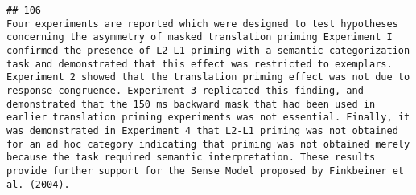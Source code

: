 \documentclass[
  english,
  man]{apa6}
\begin{document}
\begin{verbatim}
## 106                                                                                                                                                                                                                                                                                                                                                                                                                                                                                                                                                                                                                                                                                                                                                                                                                                                                                                                                                                                                                                                                                                                                                                                                                                                                                                                                                                                                                                                                                                                                                                                                                                                                                                                                                                                                         Four experiments are reported which were designed to test hypotheses concerning the asymmetry of masked translation priming Experiment I confirmed the presence of L2-L1 priming with a semantic categorization task and demonstrated that this effect was restricted to exemplars. Experiment 2 showed that the translation priming effect was not due to response congruence. Experiment 3 replicated this finding, and demonstrated that the 150 ms backward mask that had been used in earlier translation priming experiments was not essential. Finally, it was demonstrated in Experiment 4 that L2-L1 priming was not obtained for an ad hoc category indicating that priming was not obtained merely because the task required semantic interpretation. These results provide further support for the Sense Model proposed by Finkbeiner et al. (2004).

\end{verbatim}
\end{document}
